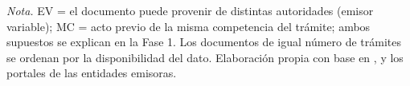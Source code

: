 \begin{table}[htbp]
\smallskip
\footnotesize\textit{Nota.} EV = el documento puede provenir de distintas autoridades (emisor variable); MC = acto previo de la misma competencia del trámite; ambos supuestos se explican en la Fase 1. Los documentos de igual número de trámites se ordenan por la disponibilidad del dato. Elaboración propia con base en \textcite{gobernaciondelhuila2026datosmaestros}, \textcite{funcionpublica2026visorsuit} y los portales de las entidades emisoras.
\end{table}
